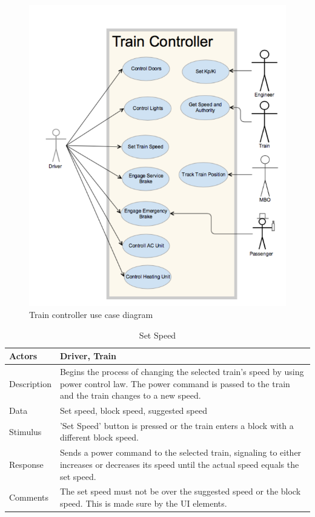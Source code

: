 \documentclass[]{article}
\begin{document}
\begin{figure}[H]
	\centering
	\includegraphics[scale=.5]{traincontrollerusecase.png}
	\caption{Train controller use case diagram}
\end{figure}

   \begin{table}[H]
   	\centering
   	\caption{Set Speed}
   	\begin{tabular}{|l|l|}
   		\hline
   		Actors & \parbox[t]{10cm}{Driver, Train} \\ \hline
   		Description & \parbox[t]{10cm}{Begins the process of changing the selected train's speed by using power control law. The power command is passed to the train and the train changes to a new speed.} \\ \hline
   		Data &  \parbox[t]{10cm}{Set speed, block speed, suggested speed} \\ \hline
   		Stimulus &  \parbox[t]{10cm}{'Set Speed' button is pressed or the train enters a block with a different block speed. } \\ \hline
   		Response & \parbox[t]{10cm}{Sends a power command to the selected train, signaling to either increases or decreases its speed until the actual speed equals the set speed.  }\\ \hline
   		Comments & \parbox[t]{10cm}{The set speed must not be over the suggested speed or the block speed. This is made sure by the UI elements. }  \\ \hline
   	\end{tabular}
   \end{table}
   
\end{document}
